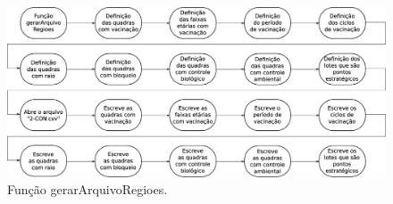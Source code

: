 \begin{figure}[H]
  \centering
  \includegraphics[width=1\textwidth]{Figuras/Simula/Fluxos/gerarArquivoRegioes.eps}
  \caption{Função gerarArquivoRegioes.}
  \label{fig:gerarArquivoRegioes}
\end{figure} 

\newpage
